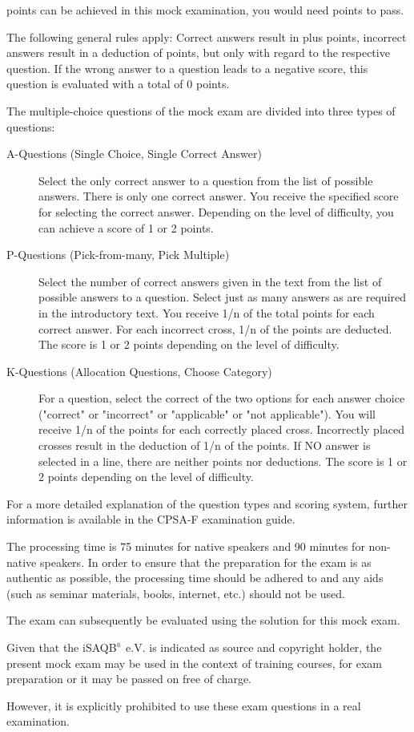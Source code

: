 \documentclass[12pt,a4paper]{article}
\newcounter{examTotalPoints}
\newcounter{examMinPoints}
\newcounter{examQuestion}\setcounter{examQuestion}{1}
\newcommand{\registered}{$^\textrm{\tiny\textregistered}$}
\begin{document}
\theexamTotalPoints{} points can be achieved in this mock examination,
you would need \theexamMinPoints{} points to pass.

The following general rules apply: Correct answers result in plus
points, incorrect answers result in a deduction of points, but only
with regard to the respective question. If the wrong answer to a
question leads to a negative score, this question is evaluated with a
total of 0 points.

The multiple-choice questions of the mock exam are divided into three
types of questions:

\begin{description}
\item[A-Questions (Single Choice, Single Correct Answer)] Select the
  only correct answer to a question from the list of possible
  answers. There is only one correct answer. You receive the specified
  score for selecting the correct answer. Depending on the level of
  difficulty, you can achieve a score of 1 or 2 points.
\item[P-Questions (Pick-from-many, Pick Multiple)] Select the number
  of correct answers given in the text from the list of possible
  answers to a question. Select just as many answers as are required
  in the introductory text. You receive 1/n of the total points for
  each correct answer. For each incorrect cross, 1/n of the points are
  deducted. The score is 1 or 2 points depending on the level of
  difficulty.
\item[K-Questions (Allocation Questions, Choose Category)] For a
  question, select the correct of the two options for each answer
  choice ("correct" or "incorrect" or "applicable" or "not
  applicable"). You will receive 1/n of the points for each correctly
  placed cross. Incorrectly placed crosses result in the deduction of
  1/n of the points. If NO answer is selected in a line, there are
  neither points nor deductions. The score is 1 or 2 points depending
  on the level of difficulty.
\end{description}

For a more detailed explanation of the question types and scoring
system, further information is available in the CPSA-F examination
guide.

The processing time is 75 minutes for native speakers and 90 minutes
for non-native speakers. In order to ensure that the preparation for
the exam is as authentic as possible, the processing time should be
adhered to and any aids (such as seminar materials, books, internet,
etc.) should not be used.

The exam can subsequently be evaluated using the solution for this
mock exam.

Given that the iSAQB\registered{} e.V. is indicated as source and copyright
holder, the present mock exam may be used in the context of training
courses, for exam preparation or it may be passed on free of charge.

However, it is explicitly prohibited to use these exam questions in a
real examination.

\newpage

\setcounter{examQuestion}{1}

\end{document}

